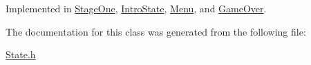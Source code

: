 Implemented in \mbox{\hyperlink{classStageOne_aa26da852d0927aace63f7054fa097e2a}{Stage\+One}}, \mbox{\hyperlink{classIntroState_a781891b1db3bdbf6af228ef85c0df00a}{Intro\+State}}, \mbox{\hyperlink{classMenu_a4d5311d60fb41b4d0498a6fc820088be}{Menu}}, and \mbox{\hyperlink{classGameOver_a960c8ff2705f1fe49b49c717ee68fbc6}{Game\+Over}}.



The documentation for this class was generated from the following file\+:\begin{DoxyCompactItemize}
\item 
\mbox{\hyperlink{State_8h}{State.\+h}}\end{DoxyCompactItemize}
